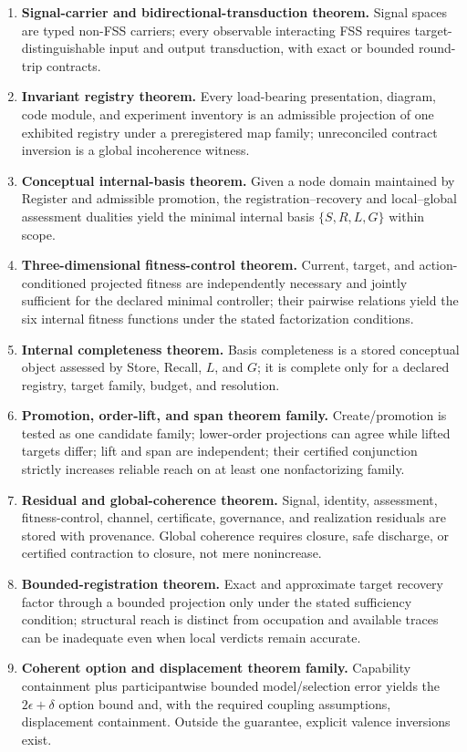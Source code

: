 \documentclass[11pt]{article}
\begin{document}
\begin{enumerate}
\item \textbf{Signal-carrier and bidirectional-transduction theorem.} Signal spaces are typed non-FSS carriers; every observable interacting FSS requires target-distinguishable input and output transduction, with exact or bounded round-trip contracts.
\item \textbf{Invariant registry theorem.} Every load-bearing presentation, diagram, code module, and experiment inventory is an admissible projection of one exhibited registry under a preregistered map family; unreconciled contract inversion is a global incoherence witness.
\item \textbf{Conceptual internal-basis theorem.} Given a node domain maintained by Register and admissible promotion, the registration--recovery and local--global assessment dualities yield the minimal internal basis $\{S,R,L,G\}$ within scope.
\item \textbf{Three-dimensional fitness-control theorem.} Current, target, and action-conditioned projected fitness are independently necessary and jointly sufficient for the declared minimal controller; their pairwise relations yield the six internal fitness functions under the stated factorization conditions.
\item \textbf{Internal completeness theorem.} Basis completeness is a stored conceptual object assessed by Store, Recall, $L$, and $G$; it is complete only for a declared registry, target family, budget, and resolution.
\item \textbf{Promotion, order-lift, and span theorem family.} Create/promotion is tested as one candidate family; lower-order projections can agree while lifted targets differ; lift and span are independent; their certified conjunction strictly increases reliable reach on at least one nonfactorizing family.
\item \textbf{Residual and global-coherence theorem.} Signal, identity, assessment, fitness-control, channel, certificate, governance, and realization residuals are stored with provenance. Global coherence requires closure, safe discharge, or certified contraction to closure, not mere nonincrease.
\item \textbf{Bounded-registration theorem.} Exact and approximate target recovery factor through a bounded projection only under the stated sufficiency condition; structural reach is distinct from occupation and available traces can be inadequate even when local verdicts remain accurate.
\item \textbf{Coherent option and displacement theorem family.} Capability containment plus participantwise bounded model/selection error yields the $2\epsilon+\delta$ option bound and, with the required coupling assumptions, displacement containment. Outside the guarantee, explicit valence inversions exist.

\end{enumerate}
\end{document}
